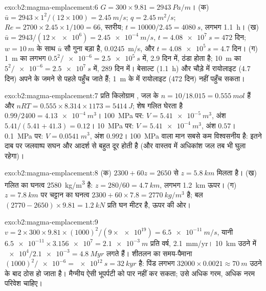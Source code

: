 \begin{solution}{exo:b2:magma-emplacement:6}
$G = 300\times9.81 = \qty{2943}{Pa/m}$। (क) $\bar u = 2943\times1^2/(12\times100) =
\qty{2.45}{m/s}$; $q = \qty{2.45}{m^2/s}$; $Re = 2700\times2.45\times1/100 = 66$, स्तरीय;
$t = 10000/2.45 = \qty{4080}{s}$, लगभग \qty{1.1}{h}। (ख) $\bar u =
2943/(12\times\num{e6}) = \qty{2.45e-4}{m/s}$, $t = \qty{4.08e7}{s} = 472$ दिन;
$w = \qty{10}{m}$ के साथ $\bar u$ सौ गुना बड़ा है, \qty{0.0245}{m/s}, और $t =
\qty{4.08e5}{s} = 4.7$ दिन। (ग) \qty{1}{m} का  लगभग
$0.5^2/\num{e-6} = \qty{2.5e5}{s}$ में, 2.9 दिन में, ठंडा होता है; \qty{10}{m} का  $5^2/\num{e-6} =
\qty{2.5e7}{s}$ में, 289 दिन में। बेसाल्ट (\qty{1.1}{h}) और चौड़े  में
रायोलाइट (4.7 दिन) अपने  के जमने से पहले पहुँच जाते हैं;
\qty{1}{m} के  में रायोलाइट (472 दिन) नहीं पहुँच सकता।
\end{solution}

\begin{solution}{exo:b2:magma-emplacement:7}
प्रति किलोग्राम , जल के $n = 10/18.015 = \qty{0.555}{mol}$ हैं और $nRT =
0.555\times8.314\times1173 = \qty{5414}{J}$; शेष गलित घेरता है $0.99/2400 =
\qty{4.13e-4}{m^3}$। \qty{100}{MPa} पर: $V = \qty{5.41e-5}{m^3}$, अंश
$5.41/(5.41 + 41.3) = 0.12$। \qty{10}{MPa} पर: $V = \qty{5.41e-4}{m^3}$, अंश
$0.57$। \qty{0.1}{MPa} पर: $V = \qty{0.0541}{m^3}$, अंश $0.992$।
\qty{100}{MPa} वाला मान सबसे कम विश्वसनीय है: इतने दाब पर जलवाष्प सघन और
आदर्श से बहुत दूर होती है (और वास्तव में अधिकांश जल तब भी घुला रहेगा)।
\end{solution}

\begin{solution}{exo:b2:magma-emplacement:8}
(क) $2300 + 60z = 2650$ से $z = \qty{5.8}{km}$ मिलता है। (ख) गलित का घनत्व
\qty{2580}{kg/m^3} है: $z = 280/60 = \qty{4.7}{km}$, लगभग \qty{1.2}{km} ऊपर। (ग)
$z = \qty{7.8}{km}$ पर चट्टान का घनत्व $2300 + 60\times7.8 = \qty{2770}{kg/m^3}$ है; बल
$(2770 - 2650)\times9.81 = \qty{1.2}{kN}$ प्रति घन मीटर है, ऊपर की ओर।
\end{solution}

\begin{solution}{exo:b2:magma-emplacement:9}
$v = 2\times300\times9.81\times(1000)^2/(9\times\num{e19}) = \qty{6.5e-11}{m/s}$, यानी
$\num{6.5e-11}\times\num{3.156e7} = \qty{2.1e-3}{m}$ प्रति वर्ष, \qty{2.1}{mm/yr}।
\qty{10}{km} उठने में $\num{e4}/\num{2.1e-3} = \qty{4.8}{Myr}$ लगते हैं। शीतलन का समय-पैमाना
$(1000)^2/\num{e-6} = \qty{e12}{s} = \qty{32}{kyr}$ है: पिंड लगभग
$32000\times0.0021 \approx \qty{70}{m}$ उठने के बाद ठोस हो जाता है। मैग्मीय 
ऐसी भूपर्पटी को पार नहीं कर सकता; उसे अधिक गरम, अधिक नरम परिवेश चाहिए।
\end{solution}

